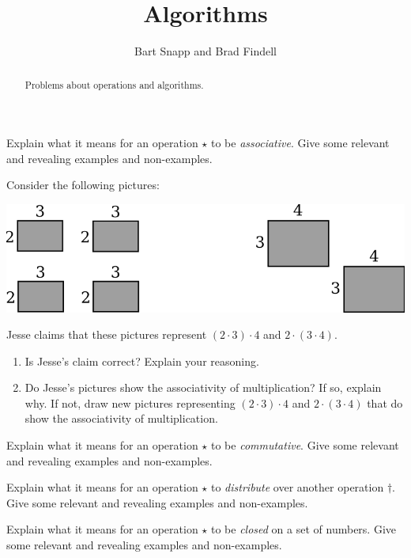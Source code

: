 \documentclass[nooutcomes]{ximera}
\title{Algorithms}
\author{Bart Snapp and Brad Findell}
\begin{document}
\begin{abstract}
Problems about operations and algorithms. 
\end{abstract}
\maketitle


\begin{problem}Explain what it means for an operation $\star$ to be
  \textit{associative}. Give some relevant and revealing examples and non-examples.
\end{problem} 

\begin{problem}\label{P:MA}Consider the following pictures:
\begin{image}
\includegraphics{assMult.png}
\end{image}
Jesse claims that these pictures represent $(2\cdot 3)\cdot 4$ and
$2\cdot (3\cdot 4)$.
\begin{enumerate}
\item Is Jesse's claim correct? Explain your reasoning.
\item Do Jesse's pictures show the associativity of multiplication? If
  so, explain why. If not, draw new pictures representing $(2\cdot
  3)\cdot 4$ and $2\cdot (3\cdot 4)$ that do show the associativity
  of multiplication.
\end{enumerate}
\end{problem} 

\begin{problem}Explain what it means for an operation $\star$ to be
  \textit{commutative}. Give some relevant and revealing examples  and non-examples.
\end{problem} 

\begin{problem}Explain what it means for an operation $\star$ to \textit{distribute}
  over another operation $\dagger$. Give some relevant and revealing
  examples and non-examples.
\end{problem} 

\begin{problem}Explain what it means for an operation $\star$ to be \textit{closed}
  on a set of numbers. Give some relevant and revealing
  examples and non-examples.
\end{problem} 
\end{document}
